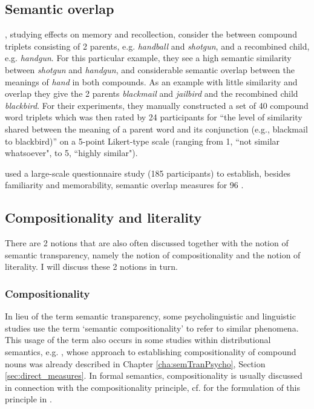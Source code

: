 \subsection{Semantic overlap}
\label{sec:sem_over}

  \citet{Odegardetal:2005}, studying effects on memory and recollection, consider the  between compound
  triplets consisting of 2 parents, e.g. \emph{handball} and \emph{shotgun},
  and a recombined child, e.g. \emph{handgun}. For this particular example,
  they see a high semantic similarity between \emph{shotgun} and
  \emph{handgun}, and considerable semantic overlap between the meanings of
  \emph{hand} in both compounds. As an example with little similarity and
  overlap they give the 2 parents \emph{blackmail} and \emph{jailbird}
  and the recombined child
  \emph{blackbird}. For their experiments, they manually constructed a set of
  40 compound word triplets which was then rated by 24 participants for ``the
  level of similarity shared between the meaning of a parent word and its
  conjunction (e.g., blackmail to blackbird)'' \citep[419]{Odegardetal:2005} on
  a 5-point Likert-type scale (ranging from 1, ``not similar
  whatsoever", to 5, ``highly similar"). %

\citet{Ledingetal:2007} used a large-scale questionnaire study (185
participants) to establish, besides familiarity and memorability, semantic overlap
measures for 96 .



\subsection{Compositionality and literality}

There are 2 notions that are also often discussed together with the
notion of semantic transparency, namely the notion of compositionality and
the notion of literality. I will discuss these 2 notions in
turn.

\subsubsection{Compositionality}
\label{sec:compositionality}
In lieu of the term semantic transparency, some psycholinguistic and linguistic studies
use the term
`semantic compositionality' to refer to similar phenomena.
This usage of the term also occurs in
some studies within distributional semantics,
e.g. \citet{Reddyetal:2011}, whose approach to establishing
compositionality of compound nouns was already
described in Chapter \ref{cha:semTranPsycho}, Section
\ref{sec:direct_measures}. In formal semantics, compositionality is usually
discussed in connection with the compositionality principle, cf. \Next for
the formulation of this principle in \citet[281]{Partee:1984}. 

